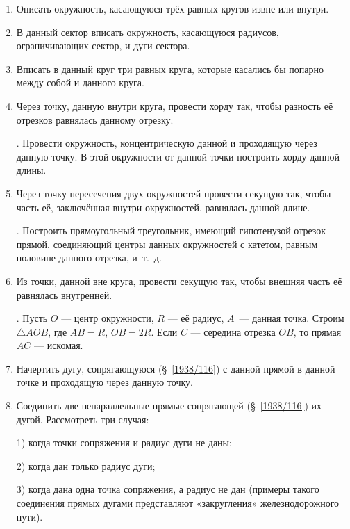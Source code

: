 \documentclass[oneside]{book}
\begin{document}
\begin{enumerate}[resume]
 \item
Описать окружность, касающуюся трёх равных кругов извне или внутри.

 \item
В данный сектор вписать окружность, касающуюся радиусов, ограничивающих сектор, и дуги сектора.

 \item
Вписать в данный круг три равных круга, которые касались бы попарно между собой и данного круга.

 \item
Через точку, данную внутри круга, провести хорду так, чтобы разность её отрезков равнялась данному отрезку.

.
Провести окружность, концентрическую данной и проходящую через данную точку.
В этой окружности от данной точки построить хорду данной длины.


 \item
Через точку пересечения двух окружностей провести секущую так, чтобы часть её, заключённая внутри окружностей, равнялась данной длине.

.
Построить прямоугольный треугольник, имеющий гипотенузой отрезок прямой, соединяющий центры данных окружностей с катетом, равным половине данного отрезка, и~т.~д.

 \item
Из точки, данной вне круга, провести секущую так, чтобы внешняя часть её равнялась внутренней.

.
Пусть $O$ — центр окружности, $R$ — её радиус, $A$~— данная точка.
Строим $\triangle AOB$, где $AB=R$, $OB=2R$.
Если $C$ — середина отрезка $OB$, то прямая $AC$ — искомая.

 \item
Начертить дугу, сопрягающуюся (§~\ref{1938/116}) с данной прямой в данной точке и проходящую через данную точку.

 \item
Соединить две непараллельные прямые сопрягающей (§~\ref{1938/116}) их дугой.
Рассмотреть три случая:

1) когда точки сопряжения и радиус дуги не даны;

2) когда дан только радиус дуги;

3) когда дана одна точка сопряжения, а радиус не дан (примеры такого соединения прямых дугами представляют «закругления» железнодорожного пути).

\end{enumerate}
\end{document}
